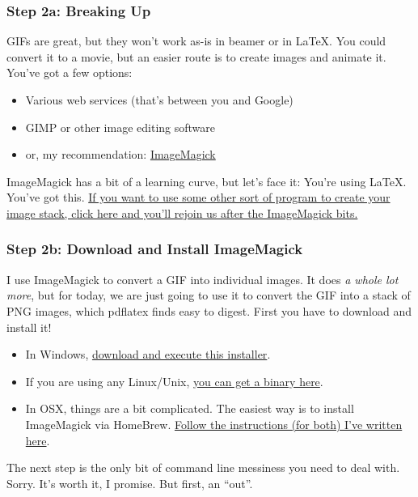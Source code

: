 \documentclass{beamer}
\begin{document}
\begin{frame}
	\frametitle{Step 2a: Breaking Up}
	GIFs are great, but they won't work as-is in beamer or in \LaTeX. You could convert it to a movie, but an easier route  is to create images and animate it. You've got a few options:
		\begin{itemize}
			\item Various web services (that's between you and Google)
			\item GIMP or other image editing software
			\item or, my recommendation: \href{https://www.imagemagick.org/script/binary-releases.php}{ImageMagick}
		\end{itemize}
	ImageMagick has a bit of a learning curve, but let's face it: You're using \LaTeX. You've got this. \hyperlink{STEP3a}{If you want to use some other sort of program to create your image stack, click here and you'll rejoin us after the ImageMagick bits.}
\end{frame}

\begin{frame}
	\frametitle{Step 2b: Download and Install ImageMagick}
	I use ImageMagick to convert a GIF into individual images. It does \emph{a whole lot more}, but for today, we are just going to use it to convert the GIF into a stack of PNG images, which pdflatex finds easy to digest. First you have to download and install it! \\
		\begin{itemize}
			\item In Windows, \href{https://www.imagemagick.org/script/binary-releases.php\#windows}{download and execute this installer}.
			\item If you are using any Linux/Unix, \href{https://www.imagemagick.org/script/binary-releases.php\#unix}{you can get a binary here}.
			\item In OSX, things are a bit complicated. The easiest way is to install ImageMagick via HomeBrew. \href{https://github.com/abhworthington/gifsinbeamer/blob/master/ImageMagickscripts/OSX/OSXfirsttime.txt}{Follow the instructions (for both) I've written here}.
		\end{itemize}
	The next step is the only bit of command line messiness you need to deal with. Sorry. It's worth it, I promise. But first, an ``out''.
\end{frame}
\end{document}
